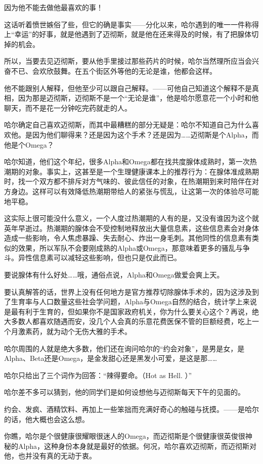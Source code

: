 \documentclass[../main]{subfiles}
\begin{document}
因为他不能去做他最喜欢的事！

这话听着愤世嫉俗了些，但它的确是事实——分化以来，哈尔遇到的唯一一件称得上“幸运”的好事，就是他遇到了迈彻斯，就是他在还来得及的时候，有了把腺体切掉的机会。

所以，当要去见迈彻斯，要从他手里接过那些药片的时候，哈尔当然理所应当会兴奋不已、会欢欣鼓舞。在五个街区外等他的无论是谁，他都会这样。

他不能跟别人解释，但他至少可以跟自己解释。——可他自己知道这个解释不是真相，因为那是迈彻斯，迈彻斯不是一个“无论是谁”，他是哈尔愿意花一个小时和他聊天，而不是花一分钟吃完药就走的人。

哈尔确定自己喜欢迈彻斯，而其中最糟糕的部分无疑是：哈尔不知道自己为什么喜欢他。是因为他们聊得来？还是因为这个手术？还是因为……迈彻斯是个Alpha，而他是个Omega？

哈尔知道，他们这个年纪，很多Alpha和Omega都在找共度腺体成熟时，第一次热潮期的对象。事实上，这甚至是一个生理健康课本上的推荐行为：在腺体准成熟期时，找一个双方都不排斥对方气味的、彼此信任的对象，在热潮期到来时陪伴在对方身边。这样可以有效降低热潮期带给人的紧张与慌乱，让这第一次的体验尽可能地平稳。

这实际上很可能没什么意义，一个人度过热潮期的人有的是，又没有谁因为这个就英年早逝过。热潮期的腺体会不受控制地释放出大量信息素，这些信息素会对身体造成一些影响，令人焦虑暴躁、失去耐心、炸出一身毛刺。其他同性的信息素有类似的效果，所以军队不会要刚成熟的Alpha或Omega，那意味着更多的骚乱与争斗。异性信息素可以减轻这些影响，但也只是仅此而已。

要说腺体有什么好处……哦，通俗点说，Alpha和Omega做爱会爽上天。

要认真解答的话，世界上没有任何地方是官方推荐切除腺体手术的，因为这涉及到了生育率与人口数量这些社会学问题，Alpha与Omega自然的结合，统计学上来说是最有利于生育的，但如果你不是国家政府机关，你为什么要关心这个？再说，绝大多数人都喜欢随遇而安，没几个人会真的乐意花费医保不管的巨额经费，吃上一个月激素药，就为动个无伤大雅的手术。

哈尔周围的人就是绝大多数，他们还在询问哈尔的“约会对象”，是男是女，是Alpha、Beta还是Omega，是金发甜心还是黑发小可爱，是这是那……

哈尔只给出了三个词作为回答：“辣得要命。（Hot as Hell. ）”

哈尔差不多可以猜到，他的同学们是如何设想他与迈彻斯每天下午的见面的。

约会、发疯、酒精饮料、再加上一些笨拙而充满好奇心的触碰与抚摸。——是哈尔的话，他大概也会这么想。

你瞧，哈尔是个很健康很耀眼很迷人的Omega，而迈彻斯是个很健康很英俊很神秘的Alpha，这种身份本身就是最好的依据。何况，哈尔喜欢迈彻斯，而迈彻斯对他，也并没有真的无动于衷。
\end{document}
